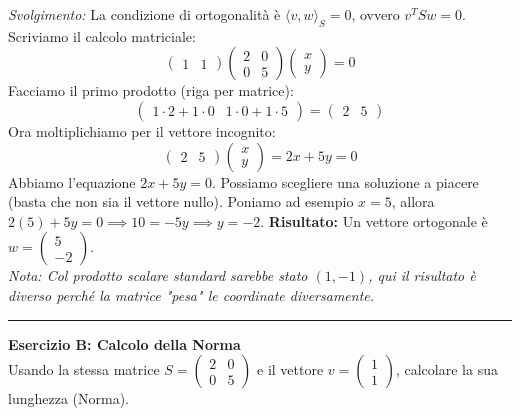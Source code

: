 \documentclass[10pt,a4paper]{article}
\begin{document}
\textit{Svolgimento:}
La condizione di ortogonalità è $\langle v, w \rangle_S = 0$, ovvero $v^T S w = 0$.
Scriviamo il calcolo matriciale:
\[ \begin{pmatrix} 1 & 1 \end{pmatrix} \begin{pmatrix} 2 & 0 \\ 0 & 5 \end{pmatrix} \begin{pmatrix} x \\ y \end{pmatrix} = 0 \]
Facciamo il primo prodotto (riga per matrice):
\[ \begin{pmatrix} 1\cdot2 + 1\cdot0 & 1\cdot0 + 1\cdot5 \end{pmatrix} = \begin{pmatrix} 2 & 5 \end{pmatrix} \]
Ora moltiplichiamo per il vettore incognito:
\[ \begin{pmatrix} 2 & 5 \end{pmatrix} \begin{pmatrix} x \\ y \end{pmatrix} = 2x + 5y = 0 \]
Abbiamo l'equazione $2x + 5y = 0$. Possiamo scegliere una soluzione a piacere (basta che non sia il vettore nullo).
Poniamo ad esempio $x = 5$, allora $2(5) + 5y = 0 \implies 10 = -5y \implies y = -2$.
\textbf{Risultato:} Un vettore ortogonale è $w = \begin{pmatrix} 5 \\ -2 \end{pmatrix}$.
\\ \textit{Nota: Col prodotto scalare standard sarebbe stato $(1, -1)$, qui il risultato è diverso perché la matrice "pesa" le coordinate diversamente.}

\vspace{0.4cm}
\hrule
\vspace{0.4cm}

\textbf{Esercizio B: Calcolo della Norma}
\\ Usando la stessa matrice $S = \begin{pmatrix} 2 & 0 \\ 0 & 5 \end{pmatrix}$ e il vettore $v = \begin{pmatrix} 1 \\ 1 \end{pmatrix}$, calcolare la sua lunghezza (Norma).
\end{document}
